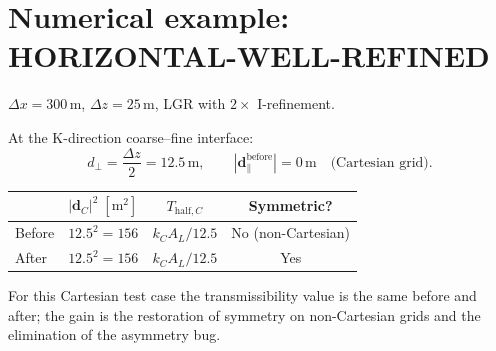 \documentclass[11pt,a4paper]{article}
\begin{document}
\section*{Numerical example: HORIZONTAL-WELL-REFINED}

\begin{center}
$\Delta x = 300\,\text{m}$, \quad
$\Delta z = 25\,\text{m}$, \quad
LGR with $2\times$ I-refinement.
\end{center}

At the K-direction coarse--fine interface:
\[
  d_\perp = \frac{\Delta z}{2} = 12.5\,\text{m}, \qquad
  |\mathbf{d}_\parallel^{\text{before}}|
    = 0\,\text{m} \quad \text{(Cartesian grid)}.
\]

\begin{center}
\begin{tabular}{lccc}
\toprule
 & $|\mathbf{d}_C|^2\;[\mathrm{m}^2]$
 & $T_{\mathrm{half},C}$
 & Symmetric? \\
\midrule
Before & $12.5^2 = 156$ & $k_C A_L / 12.5$ & No (non-Cartesian) \\
After  & $12.5^2 = 156$ & $k_C A_L / 12.5$ & Yes \\
\bottomrule
\end{tabular}
\end{center}

\medskip\noindent
For this Cartesian test case the transmissibility value is the same
before and after; the gain is the restoration of symmetry on non-Cartesian
grids and the elimination of the asymmetry bug.
\end{document}
